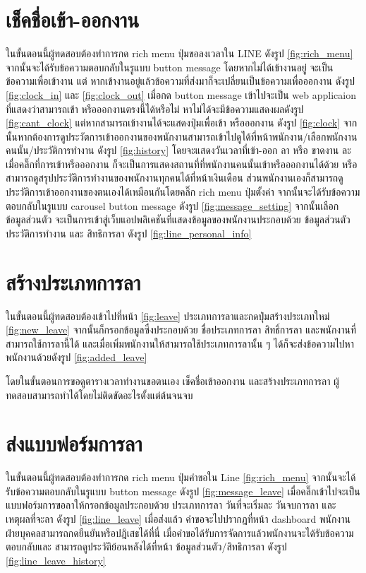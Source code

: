\section{เช็คชื่อเข้า-ออกงาน}
ในขั้นตอนนี้ผู้ทดสอบต้องทำการกด rich menu ปุ่มขอลงเวลาใน LINE ดังรูป \ref{fig:rich_menu} จากนั้นจะได้รับข้อความตอบกลับในรูแบบ button message โดยหากไม่ได้เข้างานอยู่
จะเป็นข้อความเพื่อเข้างาน แต่ หากเข้างานอยู่แล้วข้อความที่ส่งมาก็จะเปลี่ยนเป็นข้อความเพื่อออกงาน ดังรูป \ref{fig:clock_in} และ \ref{fig:clock_out} เมื่อกด button message เข้าไปจะเป็น 
web applicaion ที่แสดงว่าสามารถเข้า หรือออกงานตรงนี้ได้หรือไม่ หาไม่ได้จะมีข้อความแสดงผลดังรูป \ref{fig:cant_clock} 
แต่หากสามารถเข้างานได้จะแสดงปุ่มเพื่อเข้า หรือออกงาน ดังรูป \ref{fig:clock} 
จากนั้นหากต้องการดูประวัตการเข้าออกงานของพนักงานสามารถเข้าไปดูได้ที่หน้าพนักงาน/เลือกพนักงานคนนั้น/ประวัติการทำงาน ดังรูป \ref{fig:history} โดยจะแสดงวันเวลาที่เข้า-ออก ลา หรือ ขาดงาน
ละเมื่อคลิ๊กที่การเข้าหรือออกงาน ก็จะเป็นการแสดงสถานที่ที่พนักงานคนนั้นเข้าหรือออกงานได้ด้วย
หรือ สามารถดูสรุปประวัติการทำงานของพนักงานทุกคนได้ที่หน้าเงินเดือน 
ส่วนพนักงานเองก็สามารถดูประวัติการเข้าออกงานของตนเองได้เหมือนกันโดยคลิ๊ก rich menu ปุ่มตั้งค่า จากนั้นจะได้รับข้อความตอบกลับในรูแบบ carousel button message 
ดังรูป \ref{fig:message_setting}
จากนั้นเลือก ข้อมูลส่วนตัว จะเป็นการเข้าสู่เว็บแอปพลิเคชันที่แสดงข้อมูลของพนักงานประกอบด้วย ข้อมูลส่วนตัว ประวัติการทำงาน และ สิทธิการลา ดังรูป \ref{fig:line_personal_info}

\section{สร้างประเภทการลา}
ในขั้นตอนนี้ผู้ทดสอบต้องเข้าไปที่หน้า \ref{fig:leave} ประเภทการลาและกดปุ่มสร้างประเภทใหม่ \ref{fig:new_leave} 
จากนั้นก็กรอกข้อมูลซึ่งประกอบด้วย ชื่อประเภทการลา สิทธิ์การลา และพนักงานที่สามารถใช้การลานี้ได้
และเมื่อเพิ่มพนักงานให้สามารถใช้ประเภทการลานั้น ๆ ได้ก็จะส่งข้อความไปหาพนักงานด้วยดังรูป \ref{fig:added_leave}

โดยในขั้นตอนการขอดูตารางเวลาทำงานขอตนเอง เช็คชื่อเข้าออกงาน และสร้างประเภทการลา ผู้ทดสอบสามารถทำได้โดยไม่ติดขัดอะไรตั้งแต่ต้นจนจบ
\section{ส่งแบบฟอร์มการลา}
ในขั้นตอนนี้ผู้ทดสอบต้องทำการกด rich menu ปุ่มคำขอใน Line \ref{fig:rich_menu} จากนั้นจะได้รับข้อความตอบกลับในรูแบบ button message ดังรูป \ref{fig:message_leave}
เมื่อคลิ๊กเข้าไปจะเป็นแบบฟอร์มการขอลาให้กรอกข้อมูลประกอบด้วย ประเภทการลา วันที่จะเริ่มละ วันจบการลา และ เหตุผลที่จะลา ดังรูป \ref{fig:line_leave} เมื่อส่งแล้ว 
คำขอจะไปปรากฎที่หน้า dashboard พนักงานฝ่ายบุคคลสามารถกดยืนยันหรือปฎิเสธได้ที่นี่ เมื่อคำขอได้รับการจัดการแล้วพนักงานจะได้รับข้อความตอบกลับและ สามารถดูประวัติย้อนหลังได้ที่หน้า 
ข้อมูลส่วนตัว/สิทธิการลา ดังรูป \ref{fig:line_leave_history}

